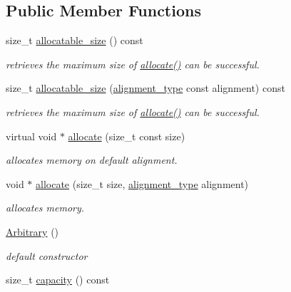 \subsection*{Public Member Functions}
\begin{DoxyCompactItemize}
\item 
size\-\_\-t \hyperlink{classhryky_1_1memory_1_1heap_1_1_arbitrary_a8e1d7c4f3687a51825418f54be5d6465}{allocatable\-\_\-size} () const 
\begin{DoxyCompactList}\small\item\em retrieves the maximum size of \hyperlink{classhryky_1_1memory_1_1heap_1_1_arbitrary_a9ea505daf2fab84a93059dbda040602d}{allocate()} can be successful. \end{DoxyCompactList}\item 
size\-\_\-t \hyperlink{classhryky_1_1memory_1_1heap_1_1_arbitrary_ac37a725c3fbaf1b1024c1e9b194f27fd}{allocatable\-\_\-size} (\hyperlink{namespacehryky_aee1af251193c2d308aaa68ef7e36a540}{alignment\-\_\-type} const alignment) const 
\begin{DoxyCompactList}\small\item\em retrieves the maximum size of \hyperlink{classhryky_1_1memory_1_1heap_1_1_arbitrary_a9ea505daf2fab84a93059dbda040602d}{allocate()} can be successful. \end{DoxyCompactList}\item 
virtual void $\ast$ \hyperlink{classhryky_1_1memory_1_1heap_1_1_arbitrary_a9ea505daf2fab84a93059dbda040602d}{allocate} (size\-\_\-t const size)
\begin{DoxyCompactList}\small\item\em allocates memory on default alignment. \end{DoxyCompactList}\item 
void $\ast$ \hyperlink{classhryky_1_1memory_1_1heap_1_1_arbitrary_a5afa088b74580514007b3f7d5688843d}{allocate} (size\-\_\-t size, \hyperlink{namespacehryky_aee1af251193c2d308aaa68ef7e36a540}{alignment\-\_\-type} alignment)
\begin{DoxyCompactList}\small\item\em allocates memory. \end{DoxyCompactList}\item 
\hyperlink{classhryky_1_1memory_1_1heap_1_1_arbitrary_aea108b28a19e3cd537c4c02bc4d032e0}{Arbitrary} ()
\begin{DoxyCompactList}\small\item\em default constructor \end{DoxyCompactList}\item 
\hypertarget{classhryky_1_1memory_1_1heap_1_1_arbitrary_a46c9013f2b61cdc826086df097fecb7c}{size\-\_\-t \hyperlink{classhryky_1_1memory_1_1heap_1_1_arbitrary_a46c9013f2b61cdc826086df097fecb7c}{capacity} () const }\label{classhryky_1_1memory_1_1heap_1_1_arbitrary_a46c9013f2b61cdc826086df097fecb7c}


\end{DoxyCompactItemize}
